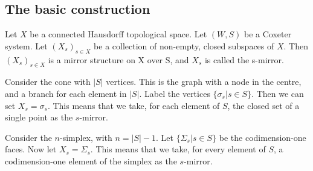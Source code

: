 \documentclass[12pt]{article}
\begin{document}
\subsection{The basic construction}
\begin{definition}
    Let $X$ be a connected Hausdorff topological space. Let $(W,S)$ be a Coxeter system. Let $(X_s)_{s\in X}$ be a collection of non-empty, closed subspaces of $X$. Then $(X_s)_{s\in X}$ is a mirror structure on X over S, and $X_s$ is called the s-mirror. 
\end{definition}

\begin{example}
    Consider the cone with $|S|$ vertices. This is the graph with a node in the centre, and a branch for each element in $|S|$. Label the vertices $\{\sigma_s|s\in S\}$. Then we can set $X_s=\sigma_s$. This means that we take, for each element of $S$, the closed set of a single point as the $s$-mirror.
\end{example}

\begin{example}
    Consider the $n$-simplex, with $n=|S|-1$. Let $\{\Sigma_s|s\in S\}$ be the codimension-one faces. Now let $X_s=\Sigma_s$. This means that we take, for every element of $S$, a codimension-one element of the simplex as the $s$-mirror.
\end{example}
\end{document}

